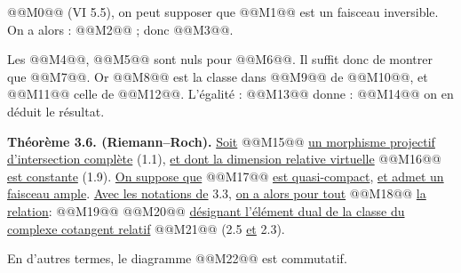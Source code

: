 
@@M0@@ (VI 5.5), on
peut supposer que @@M1@@ est un faisceau inversible. On a alors : @@M2@@ ; donc @@M3@@.

Les @@M4@@, @@M5@@ sont nuls pour @@M6@@. Il suffit donc de montrer que @@M7@@. Or @@M8@@ est la classe dans @@M9@@ de @@M10@@, et @@M11@@ celle de @@M12@@. L'égalité :
@@M13@@
donne :
@@M14@@
on en déduit le résultat.

\textbf{Théorème 3.6. (Riemann--Roch).} \uline{Soit} @@M15@@ \uline{un morphisme projectif d'intersection complète} (1.1), \uline{et dont la dimension relative virtuelle} @@M16@@ \uline{est constante} (1.9). \uline{On suppose que} @@M17@@ \uline{est quasi-compact}, \uline{et admet un faisceau ample}. \uline{Avec les notations de} 3.3, \uline{on a alors pour tout} @@M18@@ \uline{la relation}:
@@M19@@
@@M20@@ \uline{désignant l'élément dual de la classe du complexe cotangent relatif} @@M21@@ (2.5 \uline{et} 2.3).

En d'autres termes, le diagramme
@@M22@@
est commutatif.

